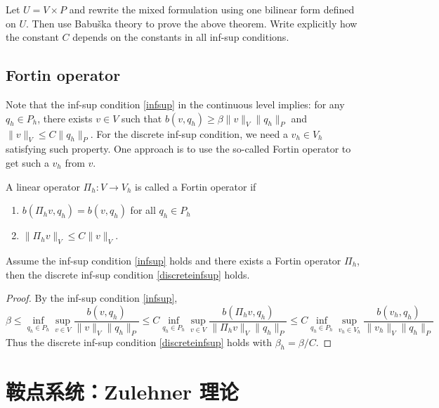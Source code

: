 \begin{exe}
Let $U = V\times P$ and rewrite the mixed formulation using one bilinear form
defined on $U$. Then use Babu\v{s}ka theory to prove the above theorem. Write explicitly how
the constant $C$ depends on the constants in all inf-sup conditions.
\end{exe}


\subsection{Fortin operator}
Note that the inf-sup condition \eqref{infsup} in the continuous level implies:
for any $q_h\in P_h$, there exists $v \in V$ such that $b(v, q_h)\geq\beta\|v\|_V\|q_h\|_P$ and $\|v\|_V\leq C\|q_h\|_P$.
For the discrete inf-sup condition, we need a $v_h\in V_h$ satisfying such property. One
approach is to use the so-called Fortin operator \cite{Fortin1977} to get such a $v_h$ from $v$.

\begin{defn}
A linear operator $\Pi_h: V\to V_h$ is called a Fortin operator
if
\begin{enumerate}
\item $b(\Pi_hv, q_h) = b(v, q_h)$ for all $q_h\in P_h$
\item $\|\Pi_hv\|_V\leq C\|v\|_V$.
\end{enumerate}
\end{defn}

\begin{theorem}
Assume the inf-sup condition \eqref{infsup} holds and there exists a Fortin operator
$\Pi_h$, then the discrete inf-sup condition \eqref{discreteinfsup} holds.
\end{theorem}
\begin{proof}
By the inf-sup condition \eqref{infsup},
\[
\beta\leq \inf_{q_h\in P_h}\sup_{v\in V}\frac{b(v, q_h)}{\|v\|_V\|q_h\|_P}\leq C\inf_{q_h\in P_h}\sup_{v\in V}\frac{b(\Pi_hv, q_h)}{\|\Pi_hv\|_V\|q_h\|_P}\leq C\inf_{q_h\in P_h}\sup_{v_h\in V_h}\frac{b(v_h, q_h)}{\|v_h\|_V\|q_h\|_P}
\]
Thus the discrete inf-sup condition \eqref{discreteinfsup} holds with $\beta_h=\beta/C$.
\end{proof}


\section{鞍点系统：Zulehner 理论}


